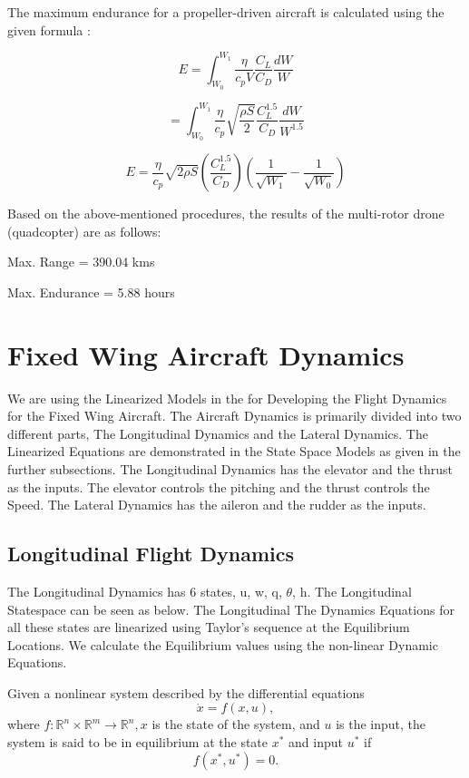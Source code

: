 The maximum endurance for a propeller-driven aircraft is calculated using the given formula :

\begin{equation}
	E = \int_{W_0}^{W_1} \frac{\eta}{c_p V}\frac{C_L}{C_D}\frac{dW}{W} 
\end{equation}

\begin{equation}
	 = \int_{W_0}^{W_1} \frac{\eta}{c_p}\sqrt{\frac{\rho S}{2}}\frac{C_L^{1.5}}{C_D}\frac{dW}{W^{1.5}} 
\end{equation}

\begin{equation}
	E = \frac{\eta}{c_p}\sqrt{2\rho S}(\frac{C_L^{1.5}}{C_D})(\frac{1}{\sqrt{W_1}} - \frac{1}{\sqrt{W_0}}) 
\end{equation}

Based on the above-mentioned procedures, the results of the multi-rotor drone (quadcopter) are as follows:

Max. Range = 390.04 kms

Max. Endurance = 5.88 hours

\section{Fixed Wing Aircraft Dynamics}
We are using the Linearized Models in the \cite{Randal2012} for Developing the Flight Dynamics for the Fixed Wing Aircraft. The Aircraft Dynamics is primarily divided into two different parts, The Longitudinal Dynamics and the Lateral Dynamics. The Linearized Equations are demonstrated in the State Space Models as given in the further subsections. The Longitudinal Dynamics has the elevator and the thrust as the inputs. The elevator controls the pitching and the thrust controls the Speed. The Lateral Dynamics has the aileron and the rudder as the inputs.


\subsection{Longitudinal Flight Dynamics}
The Longitudinal Dynamics has 6 states, u, w, q, $\theta$, h. The Longitudinal Statespace can be seen as below. The Longitudinal The Dynamics Equations for all these states are linearized using Taylor's sequence at the Equilibrium Locations. We calculate the Equilibrium values using the non-linear Dynamic Equations.

Given a nonlinear system described by the differential equations
$$
\dot{x}=f(x, u),
$$
where $f: \mathbb{R}^{n} \times \mathbb{R}^{m} \rightarrow \mathbb{R}^{n}, x$ is the state of the system, and $u$ is the input, the system is said to be in equilibrium at the state $x^{*}$ and input $u^{*}$ if
$$
f\left(x^{*}, u^{*}\right)=0 .
$$

